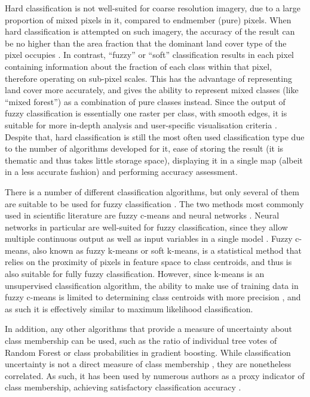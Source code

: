 \documentclass[a4paper,10pt]{article}
\begin{document}
Hard classification is not well-suited for coarse resolution imagery, due to a large proportion of mixed pixels in it, compared to endmember (pure) pixels. When hard classification is attempted on such imagery, the accuracy of the result can be no higher than the area fraction that the dominant land cover type of the pixel occupies \cite{latifovic2004accuracy}. In contrast, ``fuzzy'' or ``soft'' classification results in each pixel containing information about the fraction of each class within that pixel, therefore operating on sub-pixel scales. This has the advantage of representing land cover more accurately, and gives the ability to represent mixed classes (like ``mixed forest'') as a combination of pure classes instead. Since the output of fuzzy classification is essentially one raster per class, with smooth edges, it is suitable for more in-depth analysis and user-specific visualisation criteria \cite{tsendbazar2016integrating}. Despite that, hard classification is still the most often used classification type due to the number of algorithms developed for it, ease of storing the result (it is thematic and thus takes little storage space), displaying it in a single map (albeit in a less accurate fashion) and performing accuracy assessment.

There is a number of different classification algorithms, but only several of them are suitable to be used for fuzzy classification \cite{nath2014methods}. The two methods most commonly used in scientific literature are fuzzy c-means and neural networks \cite{zhang2001fullyfuzzy}. Neural networks in particular are well-suited for fuzzy classification, since they allow multiple continuous output as well as input variables in a single model \cite{foody1997fuzzynnet}. Fuzzy c-means, also known as fuzzy k-means or soft k-means, is a statistical method that relies on the proximity of pixels in feature space to class centroids, and thus is also suitable for fully fuzzy classification. However, since k-means is an unsupervised classification algorithm, the ability to make use of training data in fuzzy c-means is limited to determining class centroids with more precision \cite{hengl2004fuzzycmeans}, and as such it is effectively similar to maximum likelihood classification.

In addition, any other algorithms that provide a measure of uncertainty about class membership can be used, such as the ratio of individual tree votes of Random Forest or class probabilities in gradient boosting. While classification uncertainty is not a direct measure of class membership \cite{sytze2000fuzzyset}, they are nonetheless correlated. As such, it has been used by numerous authors as a proxy indicator of class membership, achieving satisfactory classification accuracy \cite{foody2002accuracy}.
\end{document}
